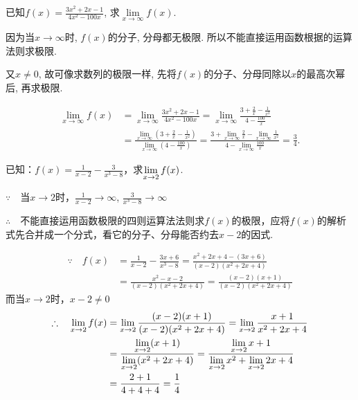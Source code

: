 \begin{example}
    已知$f(x)=\frac{3x^{2}+2x-1}{4x^{2}-100x}$, 求$\lim\limits_{x\to\infty}f(x)$.    
\end{example}

\begin{analyze}
    因为当$x\to\infty$时, $f(x)$的分子, 分母都无极限. 所以不能直接运用函数根据的运算法则求极限.

    又$x\neq0$, 故可像求数列的极限一样, 先将$f(x)$的分子、分母同除以$x$的最高次幂后, 再求极限.
\end{analyze}

\begin{solution}
\[\begin{split}
    \lim\limits_{x\to\infty}f(x)&=\lim\limits_{x\to\infty}\frac{3x^{2}+2x-1}{4x^{2}-100x}=\lim\limits_{x\to\infty}\frac{3+\frac{2}{x}-\frac{1}{x^{2}}}{4-\frac{100}{x}}\\
    &=\frac{\lim\limits_{x\to\infty}\left(3+\frac{2}{x}-\frac{1}{x^{2}}\right)}{\lim\limits_{x\to\infty}\left(4-\frac{100}{x}\right)}=\frac{3+\lim\limits_{x\to\infty}\frac{2}{x}-\lim\limits_{x\to\infty}\frac{1}{x^2}}{4-\lim\limits_{x\to\infty}\frac{100}{x}}=\frac{3}{4}.
\end{split}\]
\end{solution}

\begin{example}
已知：$f(x)=\frac{1}{x-2}-\frac{3}{x^3-8}$，求$\lim\limits_{x\to 2}f(x)$.
\end{example}

\begin{analyze}
$\because\quad $当$x\to 2$时，$\frac{1}{x-2}\to\infty$, $\frac{3}{x^3-8}\to\infty$

$\therefore\quad $不能直接运用函数极限的四则运算法法则求$f(x)$的极限，应将$f(x)$的解析式先合并成一个分式，看它的分子、分母能否约去$x-2$的因式.
\end{analyze}

\begin{solution}
\[\begin{split}
\because\quad f(x)&=\frac{1}{x-2}-\frac{3x+6}{x^3-8}=\frac{x^2+2x+4-(3x+6)}{(x-2)(x^2+2x+4)}\\
&=\frac{x^2-x-2}{(x-2)(x^2+2x+4)}=\frac{(x-2)(x+1)}{(x-2)(x^2+2x+4)}
\end{split}\]
而当$x\to 2$时，$x-2\ne 0$
\[\begin{split}
\therefore\quad \lim\limits_{x\to 2}f(x)&=\lim\limits_{x\to 2}\dfrac{(x-2)(x+1)}{(x-2)(x^2+2x+4)}=\lim\limits_{x\to 2} \dfrac{x+1}{x^2+2x+4}\\
&=\dfrac{\lim\limits_{x\to 2}(x+1)}{\lim\limits_{x\to 2}(x^2+2x+4)}=\dfrac{\lim\limits_{x\to 2}x+1}{\lim\limits_{x\to 2}x^2+\lim\limits_{x\to 2}2x+4}\\
&=\dfrac{2+1}{4+4+4}=\dfrac{1}{4}
\end{split}\]
\end{solution}


